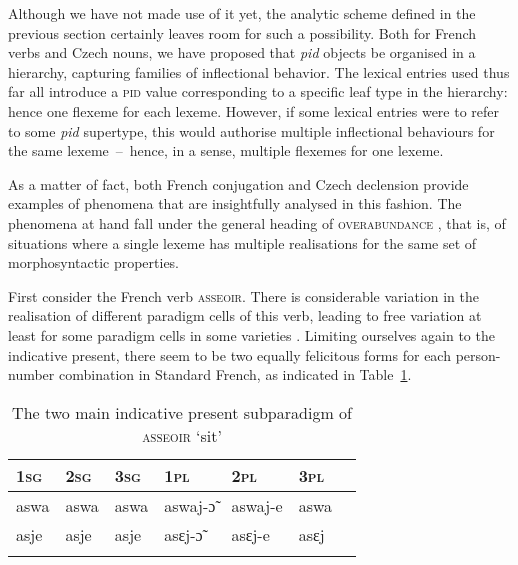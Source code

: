 \documentclass[output=paper]{langsci/langscibook}
\begin{document}
Although we have not made use of it yet, the analytic scheme defined
in the previous section certainly leaves room for such a
possibility. Both for French verbs and Czech nouns, we have proposed
that \textit{pid} objects be organised in a hierarchy, capturing
families of inflectional behavior. The lexical entries used thus far
all introduce a \textsc{pid} value corresponding to a specific leaf
type in the hierarchy: hence one flexeme for each lexeme. However, if
some lexical entries were to refer to some \textit{pid} supertype,
this would authorise multiple inflectional behaviours for the same
lexeme~--~hence, in a sense, multiple flexemes for one lexeme.

As a matter of fact, both French conjugation and Czech declension
provide examples of phenomena that are insightfully analysed in this
fashion. The phenomena at hand fall under the general heading of
\textsc{overabundance} \citep{Thornton11,Thornton12,Thornton17}, that
is, of situations where a single lexeme has multiple realisations for
the same set of morphosyntactic properties.


First consider the French verb \textsc{asseoir}. There is considerable
variation in the realisation of different paradigm cells of this verb,
leading to free variation at least for some paradigm cells in some
varieties \citep{Bonami10}. Limiting ourselves again to the indicative
present, there seem to be two equally felicitous forms for each
person-number combination in Standard French, as indicated in
Table~\ref{tab:BonamiCrysmann:asseoir}.

\begin{table}[htb]

\begin{tabular}{lllllll}
\lsptoprule
\scshape 1sg & \scshape 2sg & \scshape 3sg & \scshape 1pl & \scshape 2pl & \scshape 3pl\\
\midrule
aswa & aswa & aswa & aswaj-ɔ̃ & aswaj-e & aswa\\
asje & asje & asje & asɛj-ɔ̃ & asɛj-e & asɛj\\
\lspbottomrule
\end{tabular}
\caption{The two main indicative present subparadigm of \textsc{asseoir} `sit'\label{tab:BonamiCrysmann:asseoir}}
\end{table}
\end{document}
